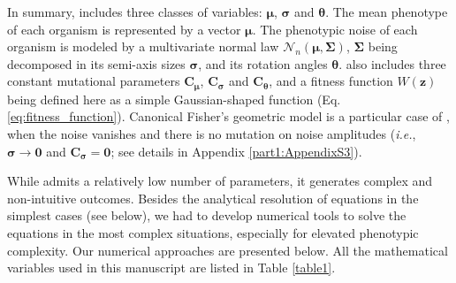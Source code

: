 In summary, {\sigmaFGM} includes three classes of variables: $\boldsymbol{\mu}$, $\boldsymbol{\sigma}$ and $\boldsymbol{\theta}$. The mean phenotype of each organism is represented by a vector $\boldsymbol{\mu}$. The phenotypic noise of each organism is modeled by a multivariate normal law $\mathcal{N}_n(\boldsymbol{\mu},\boldsymbol{\Sigma})$, $\boldsymbol{\Sigma}$ being decomposed in its semi-axis sizes $\boldsymbol{\sigma}$, and its rotation angles $\boldsymbol{\theta}$.
{\sigmaFGM} also includes three constant mutational parameters $\boldsymbol{C_\mu}$, $\boldsymbol{C_\sigma}$ and $\boldsymbol{C_\theta}$, and a fitness function $W(\boldsymbol{z})$ being defined here as a simple Gaussian-shaped function (Eq. \ref{eq:fitness_function}). Canonical Fisher's geometric model is a particular case of {\sigmaFGM}, when the noise vanishes and there is no mutation on noise amplitudes (\textit{i.e.}, $\boldsymbol{\sigma} \rightarrow \boldsymbol{0}$ and $\boldsymbol{C_\sigma} = \boldsymbol{0}$; see details in Appendix \ref{part1:AppendixS3}).

While {\sigmaFGM} admits a relatively low number of parameters, it generates complex and non-intuitive outcomes. Besides the analytical resolution of equations in the simplest cases (see below), we had to develop numerical tools to solve the equations in the most complex situations, especially for elevated phenotypic complexity. Our numerical approaches are presented below. All the mathematical variables used in this manuscript are listed in Table \ref{table1}.


